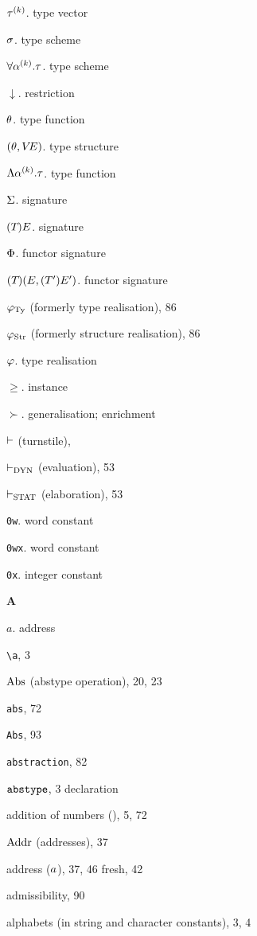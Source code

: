 \begin{theindex}
\item $\mbox{$\tau^{(k)}$}$. \see type vector
\item $\sigma$. \see type scheme
\item $\forall\mbox{$\alpha^{(k)}$}.\tau$. \see type scheme
\item $\downarrow$. \see restriction
\item $\theta$. \see type function 
\item $(\theta,\mbox{$V\!E$})$. \see type structure 
\item $\Lambda\mbox{$\alpha^{(k)}$}.\tau$. \see type function 
\item $\Sigma$. \see signature 
\item $(T_{})E_{}$. \see signature 
\item $\Phi$. \see functor signature 
\item $(T_{})(E_{},(T_{}')E_{}')$. \see functor signature
\item $\varphi_{\rm Ty}$ (formerly type realisation), 86
\item $\varphi_{\rm Str}$ (formerly structure realisation), 86
\item $\varphi$. \see type realisation
\item $\geq$. \see instance 
\item $\succ$. \see generalisation; enrichment
\item $\vdash$ (turnstile), \tsrefs
\item $\vdash_{\rm DYN}$ (evaluation), 53
\item $\vdash_{\rm STAT}$ (elaboration), 53
\item {\tt 0w}. \see word constant
\item {\tt 0wx}. \see word constant
\item {\tt 0x}. \see integer constant
\indexspace
\parbox{65mm}{\hfil{\large\bf A}\hfil}
\indexspace
\item $a$. \see address 
\item \verb+\a+, 3
\item $\mathop{\rm Abs}\nolimits$ (abstype operation), 20, 23
\item {\tt abs}, 72
\item {\tt Abs}, 93
\item {\tt abstraction}, 82
\item ${\tt abstype}$, 3
\subitem \seealso declaration
\item addition of numbers (\ml{+}), 5, 72
\item ${\rm Addr}$ (addresses), 37
\item address ($a$), 37, 46
\subitem fresh, 42
\item admissibility, 90
\item alphabets (in string and character constants), 3, 4

\end{theindex}
